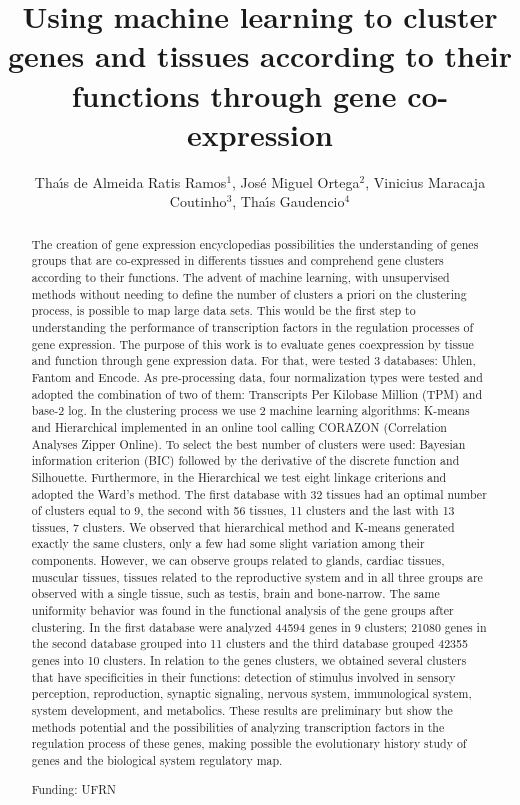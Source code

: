 \documentclass[twoside]{article}
\title{\vspace{-15mm}\fontsize{24pt}{10pt}\selectfont\textbf{Using machine learning to cluster genes and tissues according to their functions through gene co-expression}} %
\author{Tha\'{\i}s de Almeida Ratis Ramos$^1$, Jos\'e Miguel Ortega$^2$, Vinicius Maracaja Coutinho$^3$, Tha\'{\i}s Gaudencio$^4$}
\affil{1 UFRN\\ 2 UFMG, LABORAT\'ORIO DE BIODADOS.\\ 3 UNIVERSIDAD MAYOR\\ 4 UFPB\\ }
\date{}
\begin{document}
\maketitle %

\thispagestyle{fancy} %


\begin{abstract}
The creation of gene expression encyclopedias possibilities the understanding of genes groups that are co-expressed in differents tissues and comprehend gene clusters according to their functions. The advent of machine learning, with unsupervised methods without needing to define the number of clusters a priori on the clustering process, is possible to map large data sets. This would be the first step to understanding the performance of transcription factors in the regulation processes of gene expression. The purpose of this work is to evaluate genes coexpression by tissue and function through gene expression data. For that, were tested 3 databases: Uhlen, Fantom and Encode. As pre-processing data, four normalization types were tested and adopted the combination of two of them: Transcripts Per Kilobase Million (TPM) and base-2 log. In the clustering process we use 2 machine learning algorithms: K-means and Hierarchical implemented in an online tool calling CORAZON (Correlation Analyses Zipper Online). To select the best number of clusters were used: Bayesian information criterion (BIC) followed by the derivative of the discrete function and Silhouette. Furthermore, in the Hierarchical we test eight linkage criterions and adopted the Ward's method. The first database with 32 tissues had an optimal number of clusters equal to 9, the second with 56 tissues, 11 clusters and the last with 13 tissues, 7 clusters. We observed that hierarchical method and K-means generated exactly the same clusters, only a few had some slight variation among their components. However, we can observe groups related to glands, cardiac tissues, muscular tissues, tissues related to the reproductive system and in all three groups are observed with a single tissue, such as testis, brain and bone-narrow. The same uniformity behavior was found in the functional analysis of the gene groups after clustering. In the first database were analyzed 44594 genes in 9 clusters; 21080 genes in the second database grouped into 11 clusters and the third database grouped 42355 genes into 10 clusters. In relation to the genes clusters, we obtained several clusters that have specificities in their functions: detection of stimulus involved in sensory perception, reproduction, synaptic signaling, nervous system, immunological system, system development, and metabolics. These results are preliminary but show the methods potential and the possibilities of analyzing transcription factors in the regulation process of these genes, making possible the evolutionary history study of genes and the biological system regulatory map.

Funding: UFRN
\end{abstract}
\end{document}
